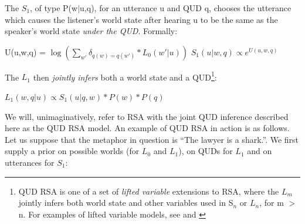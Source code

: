 \documentclass[10pt,letterpaper,twocolumn]{article}
\begin{document}

The $S_1$, of type P(w$\vert$u,q), for an utterance u and QUD q, chooses the utterance which causes the listener's world state after hearing u to be the same as the speaker's world state \emph{under the QUD}. Formally:

\begin{exe}
\ex U(u,w,q) = $\log(\sum_{w'} \delta_{q(w)=q(w')} * L_0(w'\vert u))$
\ex $S_1(u\vert w,q) \propto e^{U(u,w,q)}$
\end{exe}






The $L_1$ then \emph{jointly infers} both a world state and a QUD\footnote{QUD RSA is one of a set of \emph{lifted variable} extensions to RSA, where the $L_m$ jointly infers both world state and other variables used in S$_n$ or $L_n$, for m $>$n. For examples of lifted variable models, see \cite{kao} and \cite{bergen}}:

\begin{exe}
\ex $L_1(w,q\vert u) \propto S_1(u\vert q,w)*P(w)*P(q)$
\end{exe}

We will, unimaginatively, refer to RSA with the joint QUD inference described here as the QUD RSA model. An example of QUD RSA in action is as follows. Let us suppose that the metaphor in question is ``The lawyer is a shark.''. We first supply a prior on possible worlds (for $L_0$ and $L_1$), on QUDs for $L_1$ and on utterances for $S_1$:
\end{document}
